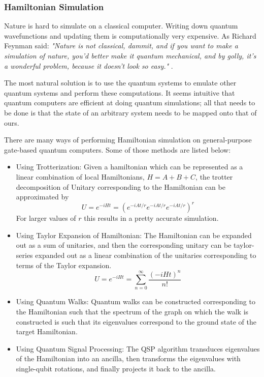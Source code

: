 \subsubsection{Hamiltonian Simulation}

Nature is hard to simulate on a classical computer. Writing down quantum wavefunctions and updating them is computationally very expensive. As Richard Feynman said: \textit{"Nature is not classical, dammit, and if you want to make a simulation of nature, you'd better make it quantum mechanical, and by golly, it's a wonderful problem, because it doesn't look so easy." } \cite{feynman-quantum-simulating-physics}.

The most natural solution is to use the quantum systems to emulate other quantum systems and perform these computations. It seems intuitive that quantum computers are efficient at doing quantum simulations; all that needs to be done is that the state of an arbitrary system needs to be mapped onto that of ours.

There are many ways of performing Hamiltonian simulation on general-purpose gate-based quantum computers. Some of those methods are listed below:
\begin{itemize}
    \item Using Trotterization: Given a hamiltonian which can be represented as a linear combination of local Hamiltonians, $H = A + B + C$, the trotter decomposition of Unitary corresponding to the Hamiltonian can be approximated by
    \begin{equation}
        U = e^{-i H t} = (e^{-i A t / r} e^{-i A t / r} e^{-i A t / r})^r
    \end{equation}
    For larger values of $r$ this results in a pretty accurate simulation.
    \item Using Taylor Expansion of Hamiltonian: The Hamiltonian can be expanded out as a sum of unitaries, and then the corresponding unitary can be taylor-series expanded out as a linear combination of the unitaries corresponding to terms of the Taylor expansion.
    \begin{equation}
        U = e^{-i H t} = \sum_{n=0}^{\infty} \frac{(-i H t)^n}{n!}
    \end{equation}
    \item Using Quantum Walks: Quantum walks can be constructed corresponding to the Hamiltonian such that the spectrum of the graph on which the walk is constructed is such that its eigenvalues correspond to the ground state of the target Hamiltonian.
    \item Using Quantum Signal Processing: The QSP algorithm transduces eigenvalues of the Hamiltonian into an ancilla, then transforms the eigenvalues with single-qubit rotations, and finally projects it back to the ancilla.
\end{itemize}


